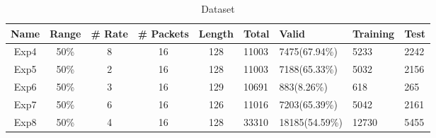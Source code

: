 \begin{table}[htpb]
   \centering
   \caption{Dataset}
   \label{tab:dataset}
   \begin{tabular}{|c|c|c|c|c|l|l|l|l|}
      \hline
      Name & Range & \# Rate & \# Packets & Length & Total & Valid          & Training & Test\\ \hline
      Exp4 & 50\%  & 8       & 16         & 128    & 11003 & 7475(67.94\%)  & 5233     & 2242 \\
      Exp5 & 50\%  & 2       & 16         & 128    & 11003 & 7188(65.33\%)  & 5032     & 2156 \\
      Exp6 & 50\%  & 3       & 16         & 129    & 10691 & 883(8.26\%)    & 618      & 265 \\
      Exp7 & 50\%  & 6       & 16         & 126    & 11016 & 7203(65.39\%)  & 5042     & 2161 \\
      Exp8 & 50\%  & 4       & 16         & 128    & 33310 & 18185(54.59\%) & 12730    & 5455  \\ \hline
   \end{tabular}
\end{table}

